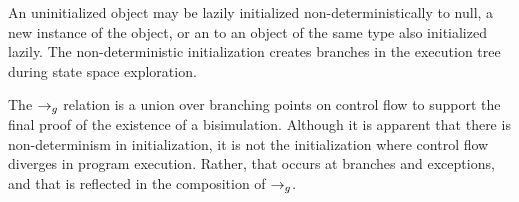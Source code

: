 An uninitialized object may be lazily initialized
non-deterministically to null, a new instance of the object, or an to
an object of the same type also initialized lazily. The
non-deterministic initialization creates branches in the execution
tree during state space exploration. 

The $\rightarrow_{g}$ relation is a union over branching points on control flow
to support the final proof of the existence of a
bisimulation. Although it is apparent that there is non-determinism in
initialization, it is not the initialization where control flow
diverges in program execution. Rather, that occurs at branches and
exceptions, and that is reflected in the composition of $\rightarrow_{g}$.




